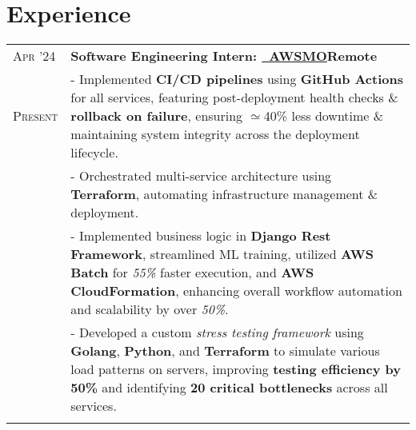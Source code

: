 \documentclass[a4paper,10pt]{extarticle} %
\begin{document}
\vspace{+0.2cm}
\section{\textcolor{primary}{Experience}}
\vspace{+0.1cm}

\begin{tabularx}{\linewidth}{ l | X }

\textsc{Apr '24} & \textbf{Software Engineering Intern: {\href{https://awsmo.ai/}{\ AWSMO}}}\hfill\textbf{Remote} \\
\textsc{Present} & {- Implemented \textbf{CI/CD pipelines} using \textbf{GitHub Actions} for all services, 
                 featuring post-deployment health checks \& \textbf{rollback on failure}, ensuring $\simeq$40\% less downtime \& maintaining system integrity across the deployment lifecycle. } \\
                 & {- Orchestrated multi-service architecture using \textbf{Terraform}, automating infrastructure management \& deployment.} \\
                 & {- Implemented business logic in \textbf{Django Rest Framework}, streamlined ML training, utilized \textbf{AWS Batch} for \textit{55\%} faster execution, and \textbf{AWS CloudFormation}, enhancing overall workflow automation and scalability} by over \textit{50\%}. \\
                 & {- Developed a custom \textit{stress testing framework} using \textbf{Golang}, \textbf{Python}, and \textbf{Terraform} to simulate various load patterns on servers, improving \textbf{testing efficiency by 50\%} and identifying \textbf{20 critical bottlenecks} across all services.} \\

\multicolumn{2}{c}{} \\
\end{tabularx}

 \vspace{-0.1cm}
\end{document}
